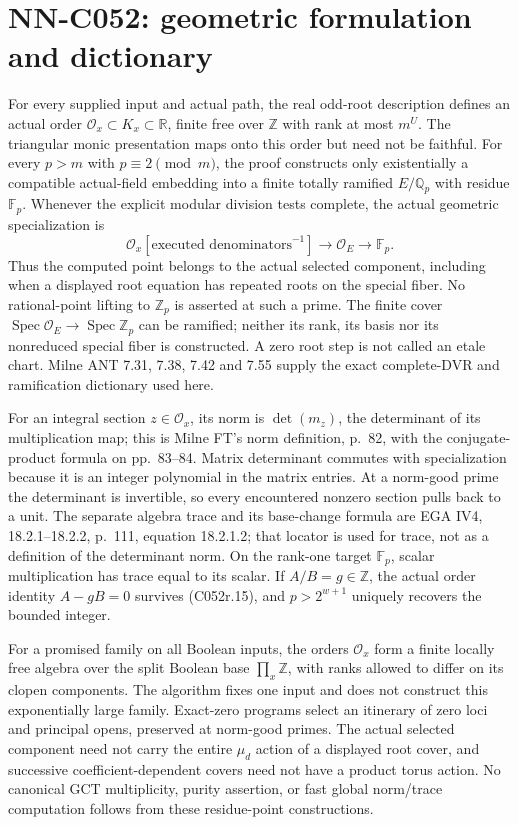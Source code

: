 \section{NN-C052: geometric formulation and dictionary}
\begin{geometricstatement}[NN-C052]
For every supplied input and actual path, the real odd-root
description defines an actual order
$\mathcal O_x\subset K_x\subset\mathbb R$, finite free over
$\mathbb Z$ with rank at most $m^U$. The triangular monic
presentation maps onto this order but need not be faithful.
For every $p>m$ with $p\equiv2\pmod m$, the proof constructs
only existentially a compatible actual-field embedding into
a finite totally ramified $E/\mathbb Q_p$ with residue
$\mathbb F_p$. Whenever the explicit modular division tests
complete, the actual geometric specialization is
\[
 \mathcal O_x[\text{executed denominators}^{-1}]
       \longrightarrow\mathcal O_E
       \longrightarrow\mathbb F_p.                        \tag{C052r.15}
\]
Thus the computed point belongs to the actual selected
component, including when a displayed root equation has
repeated roots on the special fiber. No rational-point
lifting to $\mathbb Z_p$ is asserted at such a prime.
The finite cover $\operatorname{Spec}\mathcal O_E\to
\operatorname{Spec}\mathbb Z_p$ can be ramified; neither
its rank, its basis nor its nonreduced special fiber is
constructed. A zero root step is not called an etale chart.
Milne ANT 7.31, 7.38, 7.42 and 7.55 supply the exact
complete-DVR and ramification dictionary used here.

For an integral section $z\in\mathcal O_x$, its norm is
$\det(m_z)$, the determinant of its multiplication map;
this is Milne FT's norm definition, p.~82, with the
conjugate-product formula on pp.~83--84. Matrix determinant
commutes with specialization because it is an integer
polynomial in the matrix entries. At a norm-good prime
the determinant is invertible, so every encountered
nonzero section pulls back to a unit. The separate algebra
trace and its base-change formula are EGA IV4,
18.2.1--18.2.2, p.~111, equation 18.2.1.2; that locator is
used for trace, not as a definition of the determinant norm.
On the rank-one target $\mathbb F_p$, scalar multiplication
has trace equal to its scalar. If $A/B=g\in\mathbb Z$,
the actual order identity $A-gB=0$ survives (C052r.15),
and $p>2^{w+1}$ uniquely recovers the bounded integer.

For a promised family on all Boolean inputs, the orders
$\mathcal O_x$ form a finite locally free algebra over the
split Boolean base $\prod_x\mathbb Z$, with ranks allowed
to differ on its clopen components. The algorithm fixes
one input and does not construct this exponentially large
family. Exact-zero programs select an itinerary of zero
loci and principal opens, preserved at norm-good primes.
The actual selected component need not carry the entire
$\mu_d$ action of a displayed root cover, and successive
coefficient-dependent covers need not have a product torus
action. No canonical GCT multiplicity, purity assertion,
or fast global norm/trace computation follows from these
residue-point constructions.


\end{geometricstatement}
